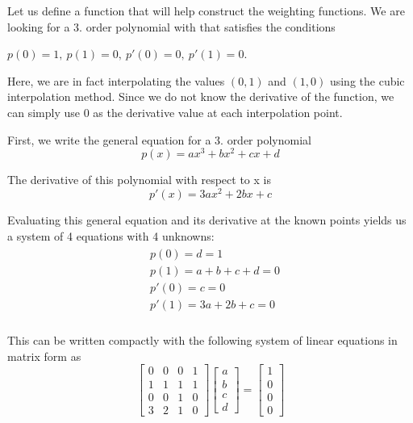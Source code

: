 \documentclass[fleqn]{article}
\begin{document}
Let us define a function that will help construct the weighting functions. We are looking for a 3. order polynomial with that satisfies the conditions 

$p(0)=1, \ p(1) = 0, \ p'(0)=0, \ p'(1) = 0$. 

Here, we are in fact interpolating the values $(0, 1)$ and $(1, 0)$ using the cubic interpolation method. Since we do not know the derivative of the function, we can simply use 0 as the derivative value at each interpolation point.

First, we write the general equation for a 3. order polynomial
\begin{equation}
p(x) = ax^3 + bx^2 + cx + d
\end{equation}

The derivative of this polynomial with respect to x is
\begin{equation}
p'(x) = 3ax^2 + 2bx + c
\end{equation}

Evaluating this general equation and its derivative at the known points yields us a system of 4 equations with 4 unknowns:
\begin{align}
\begin{split}
& p(0) = d = 1 \\
& p(1) = a + b + c + d = 0 \\
& p'(0) = c = 0 \\
& p'(1) = 3a + 2b + c = 0 \\
\end{split}
\end{align}

This can be written compactly with the following system of linear equations in matrix form as
\begin{equation}
\begin{bmatrix} 0 & 0 & 0 & 1 \\ 1 & 1 & 1 & 1 \\ 0 & 0 & 1 & 0 \\ 3 & 2 & 1 & 0 \end{bmatrix} \begin{bmatrix} a \\ b \\ c \\ d \end{bmatrix} = \begin{bmatrix} 1 \\ 0 \\ 0 \\ 0 \end{bmatrix}
\end{equation}
\end{document}
